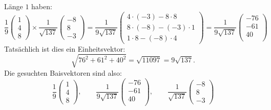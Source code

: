 \begin{loesung}
Länge $1$ haben:
\[
\frac19
\begin{pmatrix}
1\\4\\8
\end{pmatrix}
\times
\frac1{\sqrt{137}}\begin{pmatrix}-8\\8\\-3\end{pmatrix}
=
\frac1{9\sqrt{137}}
\begin{pmatrix}
4\cdot(-3)-8\cdot 8\\
8\cdot(-8)-(-3)\cdot1\\
1\cdot 8-(-8)\cdot 4
\end{pmatrix}
=
\frac1{9\sqrt{137}}
\begin{pmatrix}
-76\\
-61\\
40\\
\end{pmatrix}
\]
Tatsächlich ist dies ein Einheitsvektor:
\[
\sqrt{76^2+61^2+40^2}=\sqrt{11097}=9\sqrt{137}.
\]
Die gesuchten Baisvektoren sind also: 
\[
\frac19
\begin{pmatrix}
1\\4\\8
\end{pmatrix}
,
\qquad
\frac1{9\sqrt{137}}
\begin{pmatrix}
-76\\
-61\\
40\\
\end{pmatrix},
\qquad
\frac1{\sqrt{137}}
\begin{pmatrix}
-8\\
8\\
-3
\end{pmatrix}
\]


\end{loesung}
